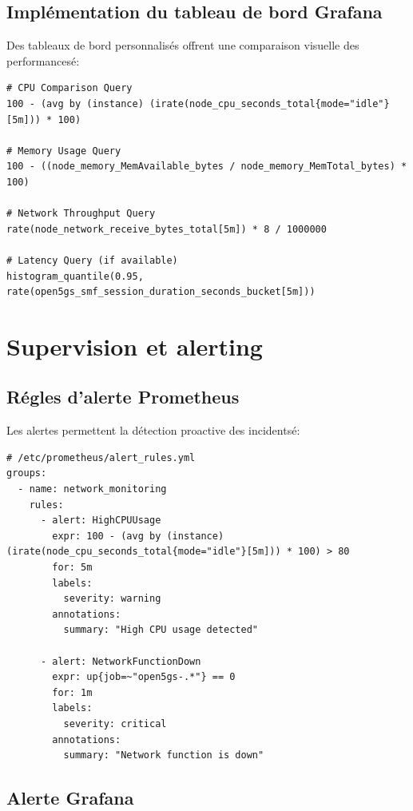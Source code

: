 \documentclass[12pt,a4paper]{report}
\begin{document}
\subsection{Implémentation du tableau de bord Grafana}

Des tableaux de bord personnalisés offrent une comparaison visuelle des performancesé:

\begin{lstlisting}[caption=Grafana Dashboard Queries]
# CPU Comparison Query
100 - (avg by (instance) (irate(node_cpu_seconds_total{mode="idle"}[5m])) * 100)

# Memory Usage Query
100 - ((node_memory_MemAvailable_bytes / node_memory_MemTotal_bytes) * 100)

# Network Throughput Query
rate(node_network_receive_bytes_total[5m]) * 8 / 1000000

# Latency Query (if available)
histogram_quantile(0.95, rate(open5gs_smf_session_duration_seconds_bucket[5m]))
\end{lstlisting}

\section{Supervision et alerting}

\subsection{Régles d'alerte Prometheus}

Les alertes permettent la détection proactive des incidentsé:

\begin{lstlisting}[caption=Prometheus Alerting Rules]
# /etc/prometheus/alert_rules.yml
groups:
  - name: network_monitoring
    rules:
      - alert: HighCPUUsage
        expr: 100 - (avg by (instance) (irate(node_cpu_seconds_total{mode="idle"}[5m])) * 100) > 80
        for: 5m
        labels:
          severity: warning
        annotations:
          summary: "High CPU usage detected"
          
      - alert: NetworkFunctionDown
        expr: up{job=~"open5gs-.*"} == 0
        for: 1m
        labels:
          severity: critical
        annotations:
          summary: "Network function is down"
\end{lstlisting}

\subsection{Alerte Grafana}
\end{document}
